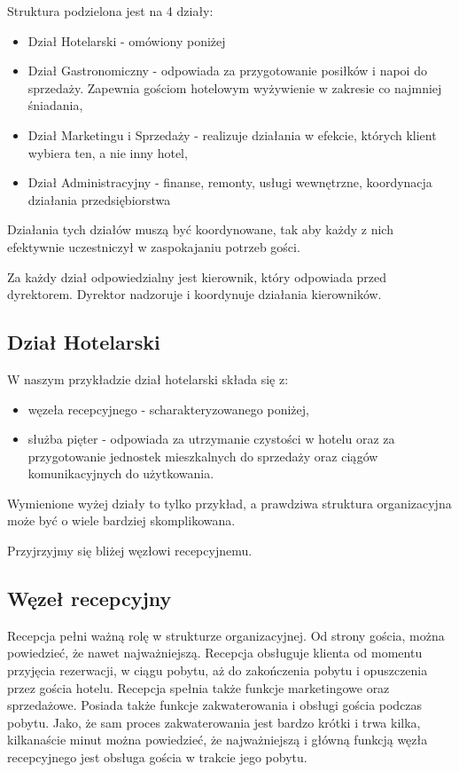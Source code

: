 \documentclass[a4paper,onecolumn,oneside,11pt,wide,floatssmall]{mwrep}
\theoremstyle{definition}
\theoremstyle{plain}%
\theoremstyle{remark}
\begin{document}
Struktura podzielona jest na 4 działy:
\begin{itemize}
  \item Dział Hotelarski - omówiony poniżej
  \item Dział Gastronomiczny - odpowiada za przygotowanie posiłków i napoi 
  do sprzedaży. Zapewnia gościom hotelowym wyżywienie w zakresie co najmniej 
  śniadania,
  \item Dział Marketingu i Sprzedaży - realizuje działania w efekcie, 
  których klient wybiera ten, a nie inny hotel,
  \item Dział Administracyjny - finanse, remonty, usługi wewnętrzne, 
  koordynacja działania przedsiębiorstwa
\end{itemize}

Działania tych działów muszą być koordynowane, tak aby każdy z nich 
efektywnie uczestniczył w zaspokajaniu potrzeb gości.

Za każdy dział odpowiedzialny jest kierownik, który odpowiada przed 
dyrektorem. Dyrektor nadzoruje i koordynuje działania kierowników.

\subsection{Dział Hotelarski}
W naszym przykładzie dział hotelarski składa się z:
\begin{itemize}
  \item węzeła recepcyjnego - scharakteryzowanego poniżej,
  \item służba pięter - odpowiada za utrzymanie czystości w hotelu oraz za 
  przygotowanie jednostek mieszkalnych do sprzedaży oraz ciągów 
  komunikacyjnych do użytkowania.
\end{itemize}

Wymienione wyżej działy to tylko przykład, a prawdziwa struktura 
organizacyjna może być o wiele bardziej skomplikowana.

Przyjrzyjmy się bliżej węzłowi recepcyjnemu.

\subsection{Węzeł recepcyjny}
Recepcja pełni ważną rolę w strukturze organizacyjnej. Od strony gościa, 
można powiedzieć, że nawet najważniejszą. 
Recepcja obsługuje klienta od momentu przyjęcia rezerwacji, w ciągu pobytu, 
aż do zakończenia pobytu i opuszczenia przez gościa hotelu. Recepcja spełnia 
także funkcje marketingowe 
oraz sprzedażowe. Posiada także funkcje zakwaterowania i obsługi gościa 
podczas pobytu. Jako, że sam proces zakwaterowania jest bardzo krótki i trwa 
kilka, kilkanaście minut można powiedzieć, że najważniejszą i główną funkcją 
węzła recepcyjnego jest obsługa gościa w trakcie jego pobytu.
\end{document}
